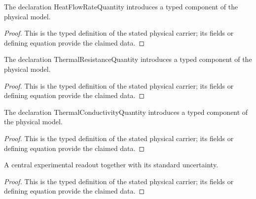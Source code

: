 \begin{definition}
  \label{def:physics:IPhO_2026_4_C_7:aux007}
  The declaration HeatFlowRateQuantity introduces a typed component of the physical model.
\end{definition}
\begin{proof}
  This is the typed definition of the stated physical carrier; its fields or defining equation provide the claimed data.
\end{proof}

\begin{definition}
  \label{def:physics:IPhO_2026_4_C_7:aux008}
  The declaration ThermalResistanceQuantity introduces a typed component of the physical model.
\end{definition}
\begin{proof}
  This is the typed definition of the stated physical carrier; its fields or defining equation provide the claimed data.
\end{proof}

\begin{definition}
  \label{def:physics:IPhO_2026_4_C_7:aux009}
  The declaration ThermalConductivityQuantity introduces a typed component of the physical model.
\end{definition}
\begin{proof}
  This is the typed definition of the stated physical carrier; its fields or defining equation provide the claimed data.
\end{proof}

\begin{definition}
  \label{def:physics:IPhO_2026_4_C_7:aux010}
  A central experimental readout together with its standard uncertainty.
\end{definition}
\begin{proof}
  This is the typed definition of the stated physical carrier; its fields or defining equation provide the claimed data.
\end{proof}

